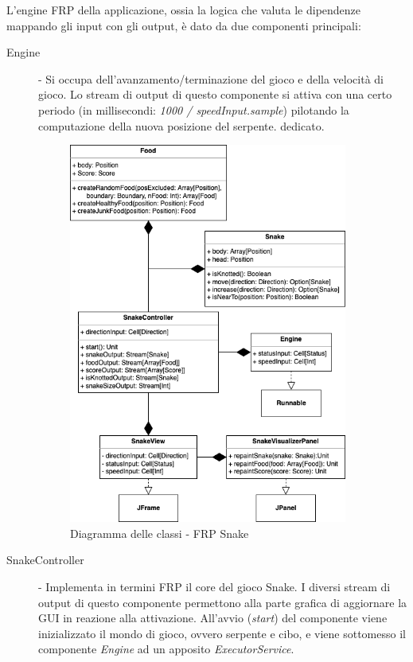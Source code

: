 \documentclass[../main.tex]{subfiles}
\begin{document}
L'engine FRP della applicazione, ossia la logica che valuta le dipendenze mappando gli input con gli output, è dato da due componenti principali:
\begin{description}
  \item[Engine] - Si occupa dell'avanzamento/terminazione del gioco e della velocità di gioco. Lo stream di output di questo componente si attiva con una certo periodo (in millisecondi: \textit{1000 / speedInput.sample}) pilotando la computazione della nuova posizione del serpente. dedicato.
  \begin{figure}[H]
\centering
\includegraphics[width=0.9\textwidth]{img/frp-scala-Page-6.drawio.png}
\caption{Diagramma delle classi - FRP Snake}
\end{figure}
  \item[SnakeController] - Implementa in termini FRP il core del gioco Snake. I diversi stream di output di questo componente permettono alla parte grafica di aggiornare la GUI in reazione alla attivazione. All'avvio (\textit{start}) del componente viene inizializzato il mondo di gioco, ovvero serpente e cibo, e viene sottomesso il componente \textit{Engine} ad un apposito \textit{ExecutorService}.
\end{description}
\end{document}
